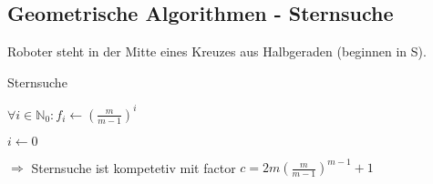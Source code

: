 \subsection{Geometrische Algorithmen - Sternsuche}

Roboter steht in der Mitte eines Kreuzes aus Halbgeraden (beginnen in S).\\



\begin{algorithm}[H]
	\caption{Sternsuche}
        
        $\forall i \in \mathbb{N}_0 : f_i \leftarrow \left(\frac{m}{m-1}\right)^i$

	$i \leftarrow 0$
	
\end{algorithm}

$\Rightarrow$ Sternsuche ist kompetetiv mit factor $c = 2m \left(\frac{m}{m-1}\right)^{m-1}+1$

